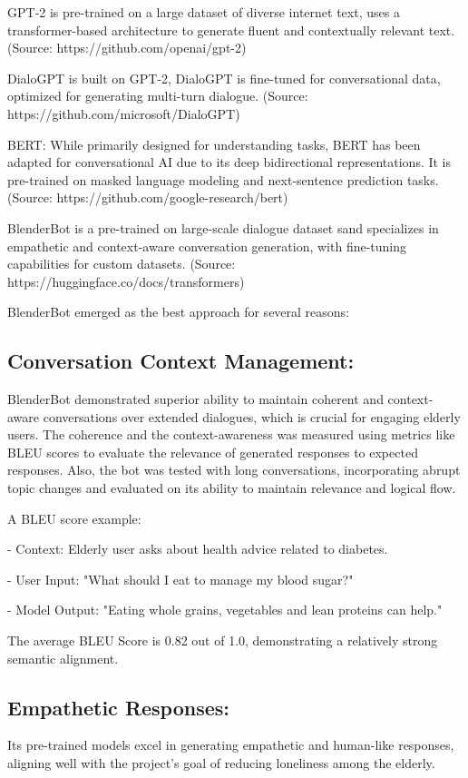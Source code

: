 \documentclass[runningheads,a4paper,11pt]{report}
\begin{document}
GPT-2 is pre-trained on a large dataset of diverse internet text, uses a transformer-based architecture to generate fluent and contextually relevant text. (Source: https://github.com/openai/gpt-2)

DialoGPT is built on GPT-2, DialoGPT is fine-tuned for conversational data, optimized for generating multi-turn dialogue. (Source: https://github.com/microsoft/DialoGPT)

BERT: While primarily designed for understanding tasks, BERT has been adapted for conversational AI due to its deep bidirectional representations. It is pre-trained on masked language modeling and next-sentence prediction tasks. (Source: https://github.com/google-research/bert)

BlenderBot is a pre-trained on large-scale dialogue dataset sand specializes in empathetic and context-aware conversation generation, with fine-tuning capabilities for custom datasets. (Source: https://huggingface.co/docs/transformers)

BlenderBot emerged as the best approach for several reasons:

\subsection{Conversation Context Management:}
 BlenderBot demonstrated superior ability to maintain coherent and context-aware conversations over extended dialogues, which is crucial for engaging elderly users. The coherence and the context-awareness was measured using metrics like BLEU scores to evaluate the relevance of generated responses to expected responses. Also, the bot was tested with long conversations, incorporating abrupt topic changes and evaluated on its ability to maintain relevance and logical flow.
 
 A BLEU score example:
 
 - Context: Elderly user asks about health advice related to diabetes.
 
 - User Input: "What should I eat to manage my blood sugar?"
 
 - Model Output: "Eating whole grains, vegetables and lean proteins can help."
 
 The average BLEU Score is 0.82 out of 1.0, demonstrating a relatively strong semantic alignment.

\subsection{Empathetic Responses:}
 Its pre-trained models excel in generating empathetic and human-like responses, aligning well with the project's goal of reducing loneliness among the elderly.
 
\end{document}
